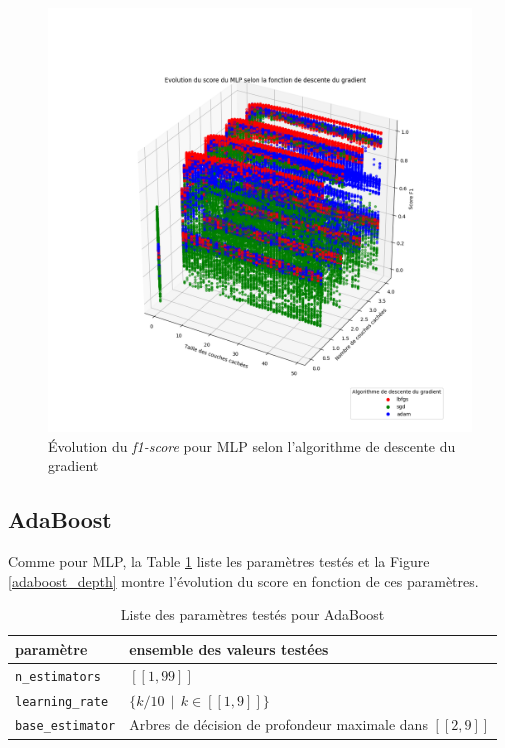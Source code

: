 \documentclass[a4paper]{report}
\begin{document}
\begin{figure}
\centering
\includegraphics[width=\textwidth]{img/mlp_solver.png}
\caption{Évolution du \emph{f1-score} pour MLP selon l'algorithme de descente du gradient\label{mlp_solver}}
\end{figure}

\subsection{AdaBoost}

Comme pour MLP, la Table \ref{params_ada} liste les paramètres testés et la Figure \ref{adaboost_depth} montre l'évolution du score en fonction de ces paramètres.

\begin{table}
\centering
\begin{tabular}{ll}
paramètre & ensemble des valeurs testées \\
\hline
\texttt{n\_estimators} & $[\![1, 99]\!]$ \\
\texttt{learning\_rate} & $\{k/10 \>\> | \>\> k \in [\![1, 9]\!] \}$ \\
\texttt{base\_estimator} & Arbres de décision de profondeur maximale dans $[\![2, 9]\!]$\\
\end{tabular}
\caption{Liste des paramètres testés pour AdaBoost\label{params_ada}}
\end{table}
\end{document}
